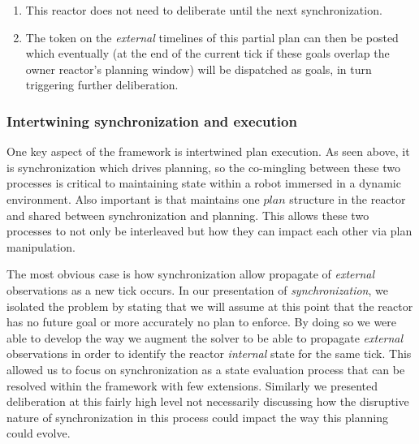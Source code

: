 \begin{enumerate}

\item This reactor does not need to deliberate until the next
  synchronization. 

\item The token on the {\em external} timelines of this partial plan
  can then be posted which eventually (at the end of the current tick
  if these goals overlap the owner reactor's planning window) will be
  dispatched as goals, in turn triggering further deliberation.

\end{enumerate}

\subsubsection{Intertwining synchronization and execution}
\label{sec:arch:intertwine}

One key aspect of the \rx framework is intertwined plan execution. As
seen above, it is synchronization which drives planning, so the
co-mingling between these two processes is critical to maintaining
state within a robot immersed in a dynamic environment. Also important
is that \rx maintains 
one $plan$ structure in the reactor and shared between synchronization
and planning. This allows these two processes to not only be
interleaved but how they can impact each other via plan manipulation.

The most obvious case is how synchronization allow propagate of {\em
  external} observations as a new tick occurs. In our presentation of 
{\em synchronization}, we isolated the problem by stating
that we will assume at this point that the reactor has no future goal
or more accurately no plan to enforce. By doing so we
were able to develop the way we augment the \eu solver to be able
to propagate {\em external} observations in order to identify the
reactor {\em internal} state for the same tick. This allowed us 
to focus on synchronization as a state evaluation process that can
be resolved within the \eu framework with few extensions. Similarly
we presented deliberation at this fairly high level not necessarily
discussing how the disruptive nature of synchronization in this
process could impact the way this planning could evolve.


